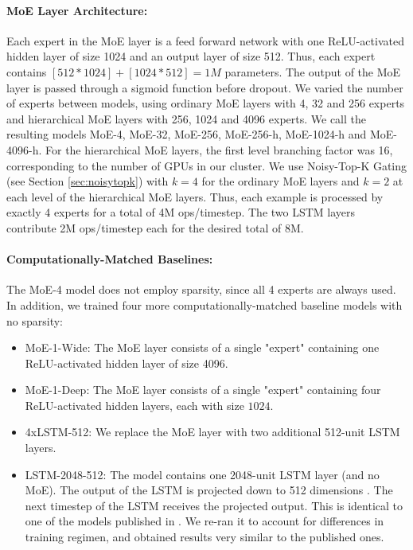 \documentclass{article} %
\begin{document}
\paragraph{MoE Layer Architecture:}  Each expert in the MoE layer is a feed forward network with one ReLU-activated hidden layer of size 1024 and an output layer of size 512.  Thus, each expert contains $[512 * 1024] + [1024 * 512] = 1M$ parameters.  The output of the MoE layer is passed through a sigmoid function before dropout.  We varied the number of experts between models, using ordinary MoE layers with 4, 32 and 256 experts and hierarchical MoE layers with 256, 1024 and 4096 experts.   We call the resulting models MoE-4, MoE-32, MoE-256, MoE-256-h, MoE-1024-h and MoE-4096-h.  For the hierarchical MoE layers, the first level branching factor was 16, corresponding to the number of GPUs in our cluster.  We use Noisy-Top-K Gating (see Section \ref{sec:noisytopk}) with $k=4$ for the ordinary MoE layers and $k=2$ at each level of the hierarchical MoE layers.  Thus, each example is processed by exactly 4 experts for a total of 4M ops/timestep.  The two LSTM layers contribute 2M ops/timestep each for the desired total of 8M.

\paragraph{Computationally-Matched Baselines:}

 
The MoE-4 model does not employ sparsity, since all 4 experts are always used.  In addition, we trained four more computationally-matched baseline models with no sparsity:

\begin{itemize}
  \item MoE-1-Wide: The MoE layer consists of a single "expert" containing one ReLU-activated hidden layer of size 4096.
  \item MoE-1-Deep: The MoE layer consists of a single "expert" containing four ReLU-activated hidden layers, each with size $1024$.
  \item 4xLSTM-512: We replace the MoE layer with two additional 512-unit LSTM layers.
  \item LSTM-2048-512: The model contains one 2048-unit LSTM layer (and no MoE).  The output of the LSTM is projected down to 512 dimensions \citep{sak2014long}.  The next timestep of the LSTM receives the projected output.  This is identical to one of the models published in \citep{RafalNoam16}.  We re-ran it to account for differences in training regimen, and obtained results very similar to the published ones.
\end{itemize}
\end{document}
